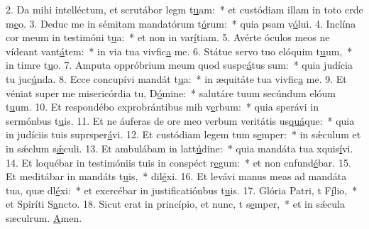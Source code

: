 2. Da mihi intelléctum, et scrutábor legm t\uline{u}am:~* et custódiam illam in toto crde m\uline{e}o.
3. Deduc me in sémitam mandatórum t\uline{ó}rum:~* quia psam v\uline{ó}lui.
4. Inclína cor meum in testimóni t\uline{u}a:~* et non in var\uline{í}tiam.
5. Avérte óculos meos ne vídeant vant\uline{á}tem:~* in via tua vivfic\uline{a} me.
6. Státue servo tuo elóquim t\uline{u}um,~* in timre t\uline{u}o.
7. Amputa oppróbrium meum quod suspc\uline{á}tus sum:~* quia judícia tu juc\uline{ú}nda.
8. Ecce concupívi mandát t\uline{u}a:~* in æquitáte tua vivfic\uline{a} me.
9. Et véniat super me misericórdia tu, D\uline{ó}mine:~* salutáre tuum secúndum elóum t\uline{u}um.
10. Et respondébo exprobrántibus mih v\uline{e}rbum:~* quia sperávi in sermónbus t\uline{u}is.
11. Et ne áuferas de ore meo verbum veritátis us\uline{quá}que:~* quia in judíciis tuis suprsper\uline{á}vi.
12. Et custódiam legem tum s\uline{e}mper:~* in sǽculum et in sǽclum s\uline{ǽ}culi.
13. Et ambulábam in latt\uline{ú}dine:~* quia mandáta tua xquis\uline{í}vi.
14. Et loquébar in testimóniis tuis in conspéct r\uline{e}gum:~* et non cnfund\uline{é}bar.
15. Et meditábar in mandáts t\uline{u}is,~*  dil\uline{é}xi.
16. Et levávi manus meas ad mandáta tua, quæ dl\uline{é}xi:~* et exercébar in justificatiónbus t\uline{u}is.
17. Glória Patri, t F\uline{í}lio,~* et Spiríti S\uline{a}ncto.
18. Sicut erat in princípio, et nunc, t s\uline{e}mper,~* et in sǽcula sæculrum. \uline{A}men.
